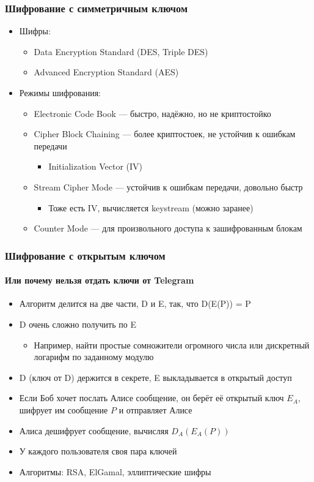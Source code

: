 \documentclass[xetex,mathserif,serif]{beamer}
\begin{document}
	\begin{frame}
		\frametitle{Шифрование с симметричным ключом}
		\begin{itemize}
			\item Шифры:
			\begin{itemize}
				\item Data Encryption Standard (DES, Triple DES)
				\item Advanced Encryption Standard (AES)
			\end{itemize}
			\item Режимы шифрования:
			\begin{itemize}
				\item Electronic Code Book --- быстро, надёжно, но не криптостойко
				\item Cipher Block Chaining --- более криптостоек, не устойчив к ошибкам передачи
				\begin{itemize}
					\item Initialization Vector (IV)
				\end{itemize}
				\item Stream Cipher Mode --- устойчив к ошибкам передачи, довольно быстр
				\begin{itemize}
					\item Тоже есть IV, вычисляется keystream (можно заранее)
				\end{itemize}
				\item Counter Mode --- для произвольного доступа к зашифрованным блокам
			\end{itemize}
		\end{itemize}
	\end{frame}

	\begin{frame}
		\frametitle{Шифрование с открытым ключом}
		\framesubtitle{Или почему нельзя отдать ключи от Telegram}
		\begin{itemize}
			\item Алгоритм делится на две части, D и E, так, что D(E(P)) = P
			\item D очень сложно получить по E
			\begin{itemize}
				\item Например, найти простые сомножители огромного числа или дискретный логарифм по заданному модулю
			\end{itemize}
			\item D (ключ от D) держится в секрете, E выкладывается в открытый доступ
			\item Если Боб хочет послать Алисе сообщение, он берёт её открытый ключ $E_A$, шифрует им сообщение $P$ и отправляет Алисе
			\item Алиса дешифрует сообщение, вычисляя $D_A(E_A(P))$
			\item У каждого пользователя своя пара ключей
			\item Алгоритмы: RSA, ElGamal, эллиптические шифры
		\end{itemize}
	\end{frame}
\end{document}
